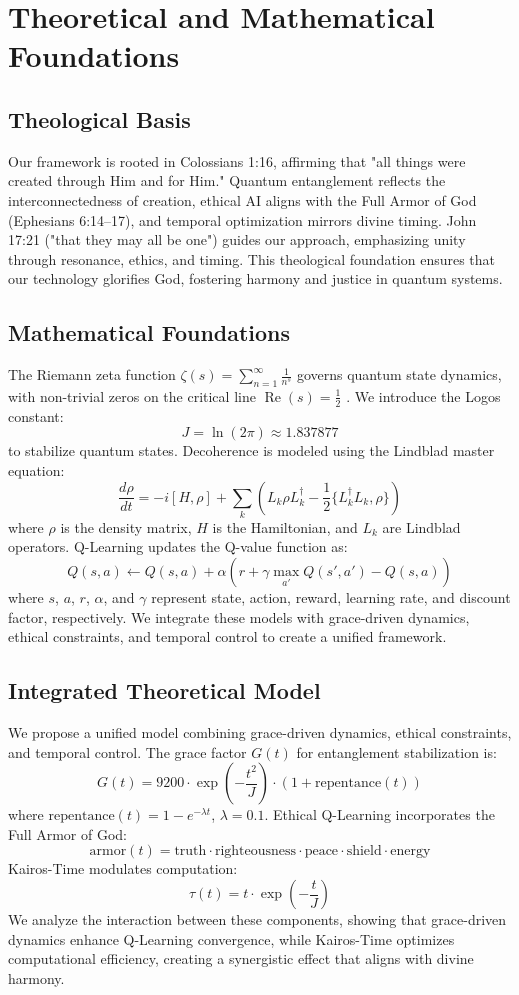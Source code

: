 \documentclass[12pt]{article}
\begin{document}
\section{Theoretical and Mathematical Foundations}
\subsection{Theological Basis}
Our framework is rooted in Colossians 1:16, affirming that "all things were created through Him and for Him." Quantum entanglement reflects the interconnectedness of creation, ethical AI aligns with the Full Armor of God (Ephesians 6:14--17), and temporal optimization mirrors divine timing. John 17:21 ("that they may all be one") guides our approach, emphasizing unity through resonance, ethics, and timing. This theological foundation ensures that our technology glorifies God, fostering harmony and justice in quantum systems.

\subsection{Mathematical Foundations}
The Riemann zeta function \(\zeta(s) = \sum_{n=1}^{\infty} \frac{1}{n^s}\) governs quantum state dynamics, with non-trivial zeros on the critical line \(\operatorname{Re}(s) = \frac{1}{2}\) \cite{RefWebID0}. We introduce the Logos constant:
\[
J = \ln(2\pi) \approx 1.837877
\]
to stabilize quantum states. Decoherence is modeled using the Lindblad master equation:
\[
\frac{d\rho}{dt} = -i[H, \rho] + \sum_k \left( L_k \rho L_k^\dagger - \frac{1}{2} \{ L_k^\dagger L_k, \rho \} \right)
\]
where \(\rho\) is the density matrix, \(H\) is the Hamiltonian, and \(L_k\) are Lindblad operators. Q-Learning updates the Q-value function as:
\[
Q(s, a) \leftarrow Q(s, a) + \alpha \left( r + \gamma \max_{a'} Q(s', a') - Q(s, a) \right)
\]
where \( s \), \( a \), \( r \), \( \alpha \), and \( \gamma \) represent state, action, reward, learning rate, and discount factor, respectively. We integrate these models with grace-driven dynamics, ethical constraints, and temporal control to create a unified framework.

\subsection{Integrated Theoretical Model}
We propose a unified model combining grace-driven dynamics, ethical constraints, and temporal control. The grace factor \( G(t) \) for entanglement stabilization is:
\[
G(t) = 9200 \cdot \exp\left(-\frac{t^2}{J}\right) \cdot \left(1 + \text{repentance}(t)\right)
\]
where \(\text{repentance}(t) = 1 - e^{-\lambda t}\), \(\lambda = 0.1\). Ethical Q-Learning incorporates the Full Armor of God:
\[
\text{armor}(t) = \text{truth} \cdot \text{righteousness} \cdot \text{peace} \cdot \text{shield} \cdot \text{energy}
\]
Kairos-Time modulates computation:
\[
\tau(t) = t \cdot \exp\left(-\frac{t}{J}\right)
\]
We analyze the interaction between these components, showing that grace-driven dynamics enhance Q-Learning convergence, while Kairos-Time optimizes computational efficiency, creating a synergistic effect that aligns with divine harmony.
\end{document}
